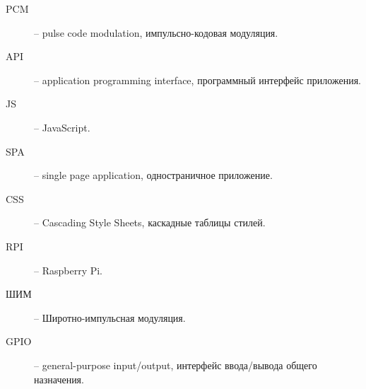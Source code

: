 \abbreviations

\begin{description}
  \item[PCM] -- pulse code modulation, импульсно-кодовая модуляция.
  \item[API] -- application programming interface, программный интерфейс приложения.
  \item[JS] -- JavaScript.
  \item[SPA] -- single page application, одностраничное приложение.
  \item[CSS] -- Cascading Style Sheets, каскадные таблицы стилей.
  \item[RPI] -- Raspberry Pi.
  \item[ШИМ] -- Широтно-импульсная модуляция.
  \item[GPIO] -- general-purpose input/output, интерфейс ввода/вывода общего назначения.
\end{description}